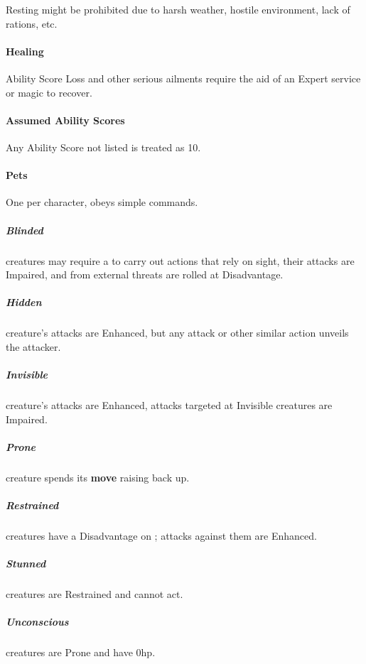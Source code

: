 \documentclass[itdr/core]{subfiles}
\begin{document}
Resting might be prohibited due to harsh weather, hostile environment, lack of rations, etc.

\vfill
\paragraph{Healing}
Ability Score Loss and other serious ailments require the aid of an Expert service or magic to recover.

\vfill
\paragraph{Assumed Ability Scores}
Any Ability Score not listed is treated as 10.


\vfill
\paragraph{Pets}
One per character, obeys simple commands.

\vfill
{}

\subparagraph{Blinded} creatures may require a  to carry out actions that rely on sight, their attacks are Impaired, and  from external threats are rolled at Disadvantage.

\subparagraph{Hidden} creature's attacks are Enhanced, but any attack or other similar action unveils the attacker.

\subparagraph{Invisible} creature's attacks are Enhanced, attacks targeted at Invisible creatures are Impaired.

\subparagraph{Prone} creature spends its \textbf{move} raising back up.

\subparagraph{Restrained} creatures have a Disadvantage on ; attacks against them are Enhanced.

\subparagraph{Stunned} creatures are Restrained and cannot act.

\subparagraph{Unconscious} creatures are Prone and have 0hp.
\end{document}
